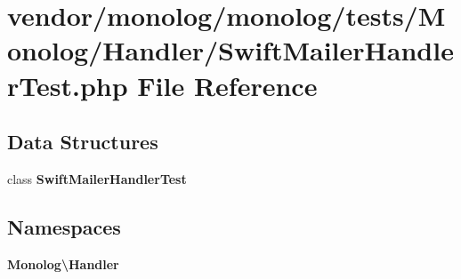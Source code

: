 \section{vendor/monolog/monolog/tests/\+Monolog/\+Handler/\+Swift\+Mailer\+Handler\+Test.php File Reference}
\label{_swift_mailer_handler_test_8php}
\subsection*{Data Structures}
\begin{DoxyCompactItemize}
\item 
class {\bf Swift\+Mailer\+Handler\+Test}
\end{DoxyCompactItemize}
\subsection*{Namespaces}
\begin{DoxyCompactItemize}
\item 
 {\bf Monolog\textbackslash{}\+Handler}
\end{DoxyCompactItemize}
